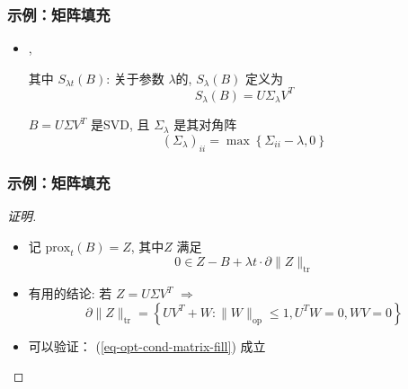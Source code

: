 \documentclass[handout]{beamer}
\begin{document}
\begin{frame}

\frametitle{示例：矩阵填充}

 
	\begin{theorem} 
		\begin{itemize}
			\item
{}, 

其中 $S_{\lambda t}(B)$: 关于参数 $\lambda$的,  
 $S_{\lambda}(B)$ 定义为
\begin{equation}
S_{\lambda}(B)=U \Sigma_{\lambda} V^{T}
\end{equation}

  $B=U \Sigma V^{T}$ 是SVD, 且 $\Sigma_{\lambda}$ 是其对角阵
\begin{equation}
	\left(\Sigma_{\lambda}\right)_{i i}=\max \left\{\Sigma_{i i}-\lambda, 0\right\}
\end{equation}

 

\end{itemize}
	\end{theorem}  


 
 
\end{frame}
\begin{frame}

\frametitle{示例：矩阵填充}


\begin{proof}[证明]
	\begin{itemize}
		\item 
	记 $\text{prox}_{t}(B)=Z$, 其中$Z$ 满足	
	\begin{equation} \label{eq-opt-cond-matrix-fill}
		0 \in Z-B+\lambda t \cdot \partial\|Z\|_{\operatorname{tr}}
	\end{equation}
	
	\item 
有用的结论: 若 $Z=U \Sigma V^{T}$ $\Rightarrow$
\begin{equation}
\partial\|Z\|_{\mathrm{tr}}=\left\{U V^{T}+W:\|W\|_{\mathrm{op}} \leq 1, U^{T} W=0, W V=0\right\}
\end{equation}

\item 可以验证： (\ref{eq-opt-cond-matrix-fill}) 成立 



\end{itemize}
\end{proof}

\end{frame}
\end{document}
